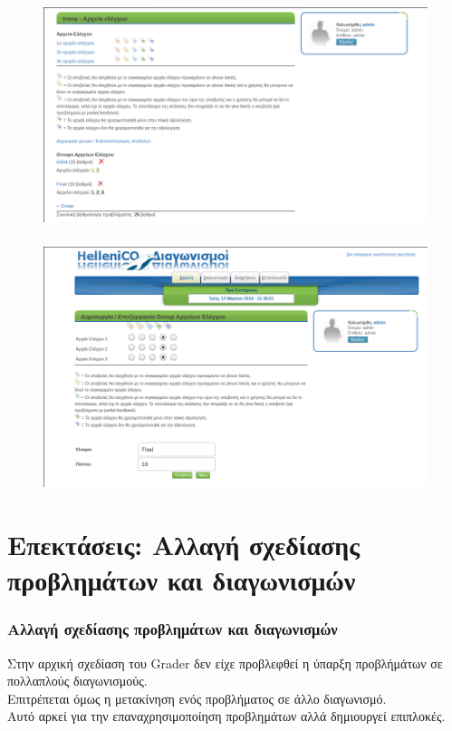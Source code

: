 \documentclass{beamer}
\begin{document}
\begin{frame}
  \frametitle{}
  \begin{figure}

    \includegraphics[scale=0.4,trim=4 4 4 4,clip]{../Figures/groupoverview.png}
  \end{figure}
\end{frame}

\begin{frame}
  \frametitle{}
  \begin{figure}

    \includegraphics[scale=0.4,trim=4 4 4 4,clip]{../Figures/groupedit.png}
  \end{figure}
\end{frame}

\section{Επεκτάσεις: Αλλαγή σχεδίασης προβλημάτων και διαγωνισμών}
\begin{frame}
  \frametitle{Αλλαγή σχεδίασης προβλημάτων και διαγωνισμών}

  Στην αρχική σχεδίαση του Grader δεν είχε προβλεφθεί η ύπαρξη προβλήμάτων
  σε πολλαπλούς διαγωνισμούς. \\[0.3cm]

  Επιτρέπεται όμως η μετακίνηση ενός προβλήματος σε άλλο διαγωνισμό. \\[0.3cm]

  Αυτό αρκεί για την επαναχρησιμοποίηση προβλημάτων αλλά δημιουργεί επιπλοκές.

\end{frame}
\end{document}
